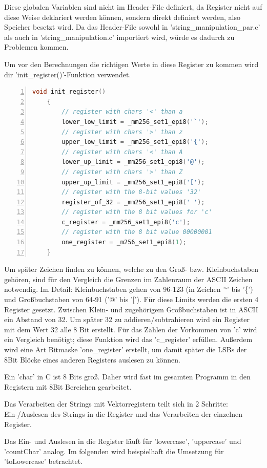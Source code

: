 \documentclass[plainarticle,zihtitle,german,final,hyperref,utf8]{zihpub}
\begin{document}
Diese globalen Variablen sind nicht im Header-File definiert, da Register nicht auf diese Weise deklariert werden können, sondern direkt definiert werden, also Speicher besetzt wird. Da das Header-File sowohl in 'string\_manipulation\_par.c' als auch in 'string\_manipulation.c' importiert wird, würde es dadurch zu Problemen kommen.

Um vor den Berechnungen die richtigen Werte in diese Register zu kommen wird dir 'init\_register()'-Funktion verwendet.

\begin{lstlisting}[language=c, numbers=left]
	void init_register()
	{
		// register with chars '<' than a
		lower_low_limit = _mm256_set1_epi8('`');
		// register with chars '>' than z
		upper_low_limit = _mm256_set1_epi8('{');
		// register with chars '<' than A
		lower_up_limit = _mm256_set1_epi8('@');
		// register with chars '>' than Z
		upper_up_limit = _mm256_set1_epi8('[');
		// register with the 8-bit values '32'
		register_of_32 = _mm256_set1_epi8(' ');
		// register with the 8 bit values for 'c'
		c_register = _mm256_set1_epi8('c');
		// register with the 8 bit value 00000001
		one_register = _m256_set1_epi8(1);
	}
\end{lstlisting}

Um später Zeichen finden zu können, welche zu den Groß- bzw. Kleinbuchstaben gehören, sind für den Vergleich die Grenzen im Zahlenraum der ASCII Zeichen notwendig. Im Detail: Kleinbuchstaben gehen von 96-123 (in Zeichen '`' bis '\{') und Großbuchstaben von 64-91 ('@' bis '{[}'). Für diese Limits werden die ersten 4 Register gesetzt. Zwischen Klein- und zugehörigem Großbuchstaben ist in ASCII ein Abstand von 32. Um später 32 zu addieren/subtrahieren wird ein Register mit dem Wert 32 alle 8 Bit erstellt. Für das Zählen der Vorkommen von 'c' wird ein Vergleich benötigt; diese Funktion wird das 'c\_register' erfüllen. Außerdem wird  eine Art Bitmaske 'one\_register' erstellt, um damit später die LSBs der 8Bit Blöcke eines anderen Registers auslesen zu können.

Ein 'char' in C ist 8 Bits groß. Daher wird fast im gesamten Programm in den Registern mit 8Bit Bereichen gearbeitet.

Das Verarbeiten der Strings mit Vektorregistern teilt sich in 2 Schritte: Ein-/Auslesen des Strings in die Register und das Verarbeiten der einzelnen Register.

Das Ein- und Auslesen in die Register läuft für 'lowercase', 'uppercase' und 'countChar' analog. Im folgenden wird beispielhaft die Umsetzung für 'toLowercase' betrachtet.
\end{document}

